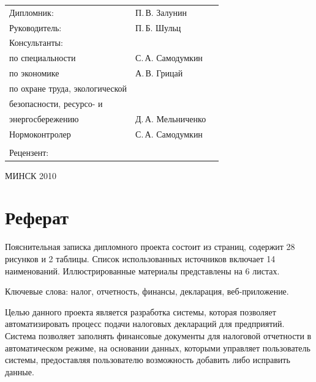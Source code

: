 \documentclass[14pt,a4paper]{reportmod}
\begin{document}
\begin{titlepage}
\begin{tabular}{p{9.5cm}p{4.5cm}r}
 Дипломник: &  П.\,В. Залунин & \\
 Руководитель: &  П.\,Б. Шульц & \\
 Консультанты: & &\\
 \hspace{1cm} по специальности &  С.\,А. Самодумкин & \\
 \hspace{1cm} по экономике &  А.\,В. Грицай & \\
 \hspace{1cm} по охране труда, экологической & &\\
 \hspace{1cm} безопасности, ресурсо- и & &\\
 \hspace{1cm} энергосбережению &  Д.\,А. Мельниченко & \\
 \hspace{1cm} Нормоконтролер &  С.\,А. Самодумкин & \\
 & &\\
 Рецензент: &  & \\
\end{tabular}

\vspace{1.8cm}

\begin{center}
МИНСК 2010%
\end{center}

\end{titlepage}

\linespread{1.05}
\setcounter{page}{5}
\thispagestyle{empty}

\newpage

\tableofcontents

\chapter*{Реферат}
Пояснительная записка дипломного проекта состоит из \pageref{LastPage} страниц, содержит 28 рисунков и 2 таблицы. Список использованных источников включает 14 наименований. Иллюстрированные материалы представлены на 6 листах.

Ключевые слова: налог, отчетность, финансы, декларация, веб-приложение.

Целью данного проекта является разработка системы, которая позволяет автоматизировать процесс подачи налоговых деклараций для предприятий. Система позволяет заполнять финансовые документы для налоговой отчетности в автоматическом режиме, на основании данных, которыми управляет пользователь системы, предоставляя пользователю возможность добавить либо исправить данные.
\end{document}

